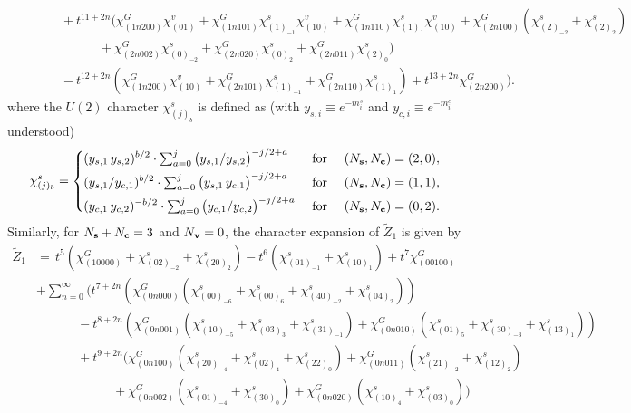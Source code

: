 \documentclass[letterpaper, 11pt]{article}
\newcommand{\nn}{\nonumber}
\begin{document}
{\begin{align}
&\qquad\quad+t^{11+2n}(\chi^G_{(1n200)}\chi^v_{(01)}+\chi^G_{(1n101)}\chi^s_{(1)_{-1}}\chi^v_{(10)}+\chi^G_{(1n110)}\chi^s_{(1)_1}\chi^v_{(10)}+\chi^G_{(2n100)}(\chi^s_{(2)_{-2}}+\chi^s_{(2)_2})\nn\\
&\qquad\qquad\qquad+\chi^G_{(2n002)}\chi^s_{(0)_{-2}}+\chi^G_{(2n020)}\chi^s_{(0)_2}+\chi^G_{(2n011)}\chi^s_{(2)_0})\nn\\
&\qquad\quad-t^{12+2n}(\chi^G_{(1n200)}\chi^v_{(10)}+\chi^G_{(2n101)}\chi^s_{(1)_{-1}}+\chi^G_{(2n110)}\chi^s_{(1)_1})+t^{13+2n}\chi^G_{(2n200)}\Big).
\end{align}
where the $U(2)$ character $\chi^s_{(j)_b}$ is defined as (with $y_{s,i} \equiv e^{-m_i^s}$ and $y_{c,i} \equiv e^{-m_i^c}$ understood)
\begin{align}
  \chi^s_{(j)_b} = \begin{dcases}
    (y_{s,1}\,y_{s,2})^{b/2} \cdot \textstyle\sum_{a=0}^{j} \big({y_{s,1}}/{y_{s,2}}\big)^{-j/2+a}& \text{ for } \quad (N_\mathbf{s}, N_\mathbf{c})=(2,0),\\
    (y_{s,1}/y_{c,1})^{b/2} \cdot \textstyle\sum_{a=0}^{j} \big(y_{s,1}\,y_{c,1}\big)^{-j/2+a}& \text{ for } \quad (N_\mathbf{s}, N_\mathbf{c})=(1,1),\\
    (y_{c,1}\,y_{c,2})^{-b/2} \cdot \textstyle\sum_{a=0}^{j} \big(y_{c,1}/y_{c,2}\big)^{-j/2+a}& \text{ for } \quad (N_\mathbf{s}, N_\mathbf{c})=(0,2).
  \end{dcases}
\end{align}
Similarly, for $N_{\bf s} + N_{\bf c} = 3$ and $N_{\bf v} = 0$, the character expansion of $\tilde{Z}_1$ is given by 
\begin{align}
  \label{eq:so10-s3}
\tilde{Z}_1&=\,t^5(\chi^G_{(10000)}+\chi^s_{(02)_{-2}}+\chi^s_{(20)_2})-t^6
(\chi^s_{(01)_{-1}}+\chi^s_{(10)_1})+t^7\chi^G_{(00100)}\nn\\
&+\textstyle\sum_{n=0}^{\infty}\Big(t^{7+2n}(\chi^G_{(0n000)}(\chi^s_{(00)_{-6}}+\chi^s_{(00)_6}+\chi^s_{(40)_{-2}}+\chi^s_{(04)_2}))\nn\\
&\qquad \quad \ -t^{8+2n}(\chi^G_{(0n001)}(\chi^s_{(10)_{-5}}+\chi^s_{(03)_3}+\chi^s_{(31)_{-1}})+\chi^G_{(0n010)}(\chi^s_{(01)_5}+\chi^s_{(30)_{-3}}+\chi^s_{(13)_1}))\nn\\
&\qquad \quad \ +t^{9+2n}(\chi^G_{(0n100)}(\chi^s_{(20)_{-4}}+\chi^s_{(02)_4}+\chi^s_{(22)_0})+\chi^G_{(0n011)}(\chi^s_{(21)_{-2}}+\chi^s_{(12)_2})\nn\\
& \qquad \qquad\qquad+\chi^G_{(0n002)}(\chi^s_{(01)_{-4}}+\chi^s_{(30)_0})+\chi^G_{(0n020)}(\chi^s_{(10)_4}+\chi^s_{(03)_0}))\\

\end{align}}
\end{document}
